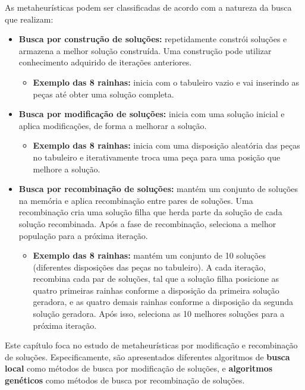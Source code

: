 As metaheurísticas podem ser classificadas de acordo com a natureza da busca que realizam:
\begin{itemize}
	\item \textbf{Busca por construção de soluções:} repetidamente constrói soluções e armazena a melhor solução construída. Uma construção pode utilizar conhecimento adquirido de iterações anteriores.
	\begin{itemize}
		\item \textbf{Exemplo das 8 rainhas:} inicia com o tabuleiro vazio e vai inserindo as peças até obter uma solução completa.
	\end{itemize}
	
	\item \textbf{Busca por modificação de soluções:} inicia com uma solução inicial e aplica modificações, de forma a melhorar a solução.
	\begin{itemize}
		\item \textbf{Exemplo das 8 rainhas:} inicia com uma disposição aleatória das peças no tabuleiro e iterativamente troca uma peça para uma posição que melhore a solução.
	\end{itemize}
	
	\item \textbf{Busca por recombinação de soluções:} mantém um conjunto de soluções na memória e aplica recombinação entre pares de soluções. Uma recombinação cria uma solução filha que herda parte da solução de cada solução recombinada. Após a fase de recombinação, seleciona a melhor população para a próxima iteração.
	\begin{itemize}
		\item \textbf{Exemplo das 8 rainhas:} mantém um conjunto de 10 soluções (diferentes disposições das peças no tabuleiro). A cada iteração, recombina cada par de soluções, tal que a solução filha posicione as quatro primeiras rainhas conforme a disposição da primeira solução geradora, e as quatro demais rainhas conforme a disposição da segunda solução geradora. Após isso, seleciona as 10 melhores soluções para a próxima iteração.
	\end{itemize}
\end{itemize}

Este capítulo foca no estudo de metaheurísticas por modificação e recombinação de soluções. Especificamente, são apresentados diferentes algoritmos de \textbf{busca local} como métodos de busca por modificação de soluções, e \textbf{algoritmos genéticos} como métodos de busca por recombinação de soluções.

